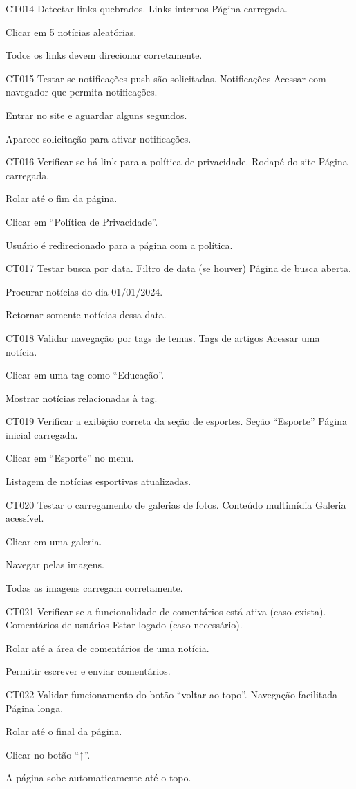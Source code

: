 \documentclass[12pt]{article}
\begin{document}
\casodeteste
{CT014}
{Detectar links quebrados.}
{Links internos}
{Página carregada.}
{
\item Clicar em 5 notícias aleatórias.
}
{Todos os links devem direcionar corretamente.}

\casodeteste
{CT015}
{Testar se notificações push são solicitadas.}
{Notificações}
{Acessar com navegador que permita notificações.}
{
\item Entrar no site e aguardar alguns segundos.
}
{Aparece solicitação para ativar notificações.}

\casodeteste
{CT016}
{Verificar se há link para a política de privacidade.}
{Rodapé do site}
{Página carregada.}
{
\item Rolar até o fim da página.
\item Clicar em “Política de Privacidade”.
}
{Usuário é redirecionado para a página com a política.}

\casodeteste
{CT017}
{Testar busca por data.}
{Filtro de data (se houver)}
{Página de busca aberta.}
{
\item Procurar notícias do dia 01/01/2024.
}
{Retornar somente notícias dessa data.}

\casodeteste
{CT018}
{Validar navegação por tags de temas.}
{Tags de artigos}
{Acessar uma notícia.}
{
\item Clicar em uma tag como “Educação”.
}
{Mostrar notícias relacionadas à tag.}

\casodeteste
{CT019}
{Verificar a exibição correta da seção de esportes.}
{Seção “Esporte”}
{Página inicial carregada.}
{
\item Clicar em “Esporte” no menu.
}
{Listagem de notícias esportivas atualizadas.}

\casodeteste
{CT020}
{Testar o carregamento de galerias de fotos.}
{Conteúdo multimídia}
{Galeria acessível.}
{
\item Clicar em uma galeria.
\item Navegar pelas imagens.
}
{Todas as imagens carregam corretamente.}

\casodeteste
{CT021}
{Verificar se a funcionalidade de comentários está ativa (caso exista).}
{Comentários de usuários}
{Estar logado (caso necessário).}
{
\item Rolar até a área de comentários de uma notícia.
}
{Permitir escrever e enviar comentários.}

\casodeteste
{CT022}
{Validar funcionamento do botão “voltar ao topo”.}
{Navegação facilitada}
{Página longa.}
{
\item Rolar até o final da página.
\item Clicar no botão “↑”.
}
{A página sobe automaticamente até o topo.}
\end{document}
